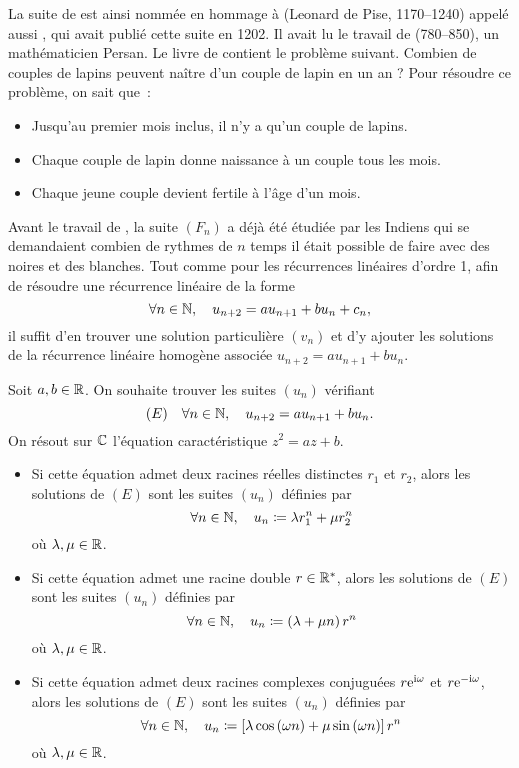 \documentclass{magnolia}
\begin{document}
\begin{remarques}
\remarque La suite de  est ainsi nommée en hommage à  (Leonard de Pise, 1170--1240) appelé aussi , qui avait publié cette suite en 1202. Il avait lu le travail de  (780--850), un mathématicien Persan. Le livre de  contient le problème suivant. Combien de couples de lapins peuvent naître d'un couple de lapin en un an ? Pour résoudre ce problème, on sait que~:
\begin{itemize}
\item Jusqu'au premier mois inclus, il n'y a qu'un couple de lapins.
\item Chaque couple de lapin donne naissance à un couple tous les mois.
\item Chaque jeune couple devient fertile à l'âge d'un mois.
\end{itemize}
Avant le travail de , la suite $(F_n)$ a déjà été étudiée par les Indiens qui se demandaient combien de rythmes de $n$ temps il était possible de faire avec des noires et des blanches.
\remarque Tout comme pour les récurrences linéaires d'ordre 1, afin de
  résoudre une récurrence linéaire de la forme
  \[\forall n\in\mathbb{N},\quad u_{n+2}=a u_{n+1}+b u_n + c_n,\]
  il suffit d'en trouver une solution particulière $(v_n)$ et d'y ajouter les solutions
  de la récurrence linéaire homogène associée $u_{n+2}=a u_{n+1}+b u_n$.
\end{remarques}

\begin{proposition}[utile=-3]
Soit $a,b\in\mathbb{R}$. On souhaite trouver les suites $(u_n)$ vérifiant
\[(E) \quad \forall n\in\mathbb{N} ,\quad u_{n+2}=au_{n+1}+b u_n.\]
On résout sur $\mathbb{C}$ l'équation caractéristique $z^2=az+b$.
\begin{itemize}
\item Si cette équation admet deux racines réelles distinctes $r_1$ et $r_2$,
  alors les solutions de $(E)$ sont les suites $(u_n)$ définies par
  \[\forall n\in\mathbb{N} ,\quad u_n\coloneqq\lambda r_1^n +\mu r_2^n\]
  où $\lambda,\mu\in\mathbb{R}$.
\item Si cette équation admet une racine double $r\in{\mathbb{R}^*}$,
  alors les solutions de $(E)$ sont les suites $(u_n)$ définies par
  \[\forall n\in\mathbb{N} ,\quad u_n\coloneqq\left(\lambda +\mu n\right)r^n\]
  où $\lambda,\mu\in\mathbb{R}$.
\item Si cette équation admet deux racines complexes conjuguées $r{\rm e}^{{\rm i}\omega}$ et
  $r{\rm e}^{-{\rm i}\omega}$, 
  alors les solutions de $(E)$ sont les suites $(u_n)$ définies par
  \[\forall n\in\mathbb{N} ,\quad u_n\coloneqq\left[\lambda \cos\left(\omega n\right)+\mu \sin\left(\omega n\right)\right]
    r^n\]
  où $\lambda,\mu\in\mathbb{R}$.
\end{itemize}
\end{proposition}
\end{document}
